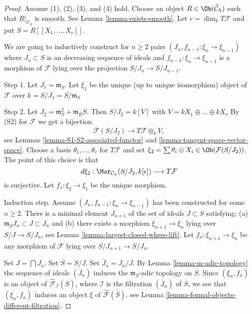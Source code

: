 \begin{proof}
Assume (1), (2), (3), and (4) hold. Choose an object
$R \in \Ob(\widehat{\mathcal{C}}_\Lambda)$
such that $\underline{R}|_{\mathcal{C}_\Lambda}$ is smooth.
See Lemma \ref{lemma-exists-smooth}.
Let $r = \dim_k T\mathcal{F}$ and put $S = R[[X_1, \ldots, X_r]]$.

\medskip\noindent
We are going to inductively construct for $n \geq 2$ pairs
$(J_n, f_{n - 1} : \xi_n \to \xi_{n - 1})$
where $J_n \subset S$ is an decreasing sequence of ideals and
$f_{n - 1} : \xi_n \to \xi_{n - 1}$ is a morphism of
$\mathcal{F}$ lying over the projection $S/J_n \to S/J_{n - 1}$.

\medskip\noindent
Step 1. Let $J_1 = \mathfrak m_S$. Let $\xi_1$ be the unique
(up to unique isomorphism) object of $\mathcal{F}$ over
$k = S/J_1 = S/\mathfrak m_S$

\medskip\noindent
Step 2. Let
$J_2 = \mathfrak m_S^2 + \mathfrak{m}_R S$. Then
$S/J_2 = k[V]$ with $V = kX_1 \oplus \ldots \oplus kX_r$
By (S2) for $\overline{\mathcal{F}}$ we get a bijection
$$
\overline{\mathcal{F}}(S/J_2)
\longrightarrow
T\mathcal{F} \otimes_k V,
$$
see
Lemmas \ref{lemma-S1-S2-associated-functor} and
\ref{lemma-tangent-space-vector-space}.
Choose a basis $\theta_1, \ldots, \theta_r$ for $T\mathcal{F}$ and set
$\xi_2 = \sum \theta_i \otimes X_i \in \Ob(\mathcal{F}(S/J_2))$.
The point of this choice is that
$$
d\xi_2 :
\Mor_{\mathcal{C}_\Lambda}(S/J_2, k[\epsilon])
\longrightarrow
T\mathcal{F}
$$
is surjective. Let $f_1 : \xi_2 \to \xi_1$ be the unique morphism.

\medskip\noindent
Induction step. Assume $(J_n, f_{n - 1} : \xi_n \to \xi_{n - 1})$ has been
constructed for some $n \geq 2$. There is a minimal element $J_{n + 1}$ of
the set of ideals $J \subset S$ satisfying:
(a) $\mathfrak m_S J_n \subset J \subset J_n$ and
(b) there exists a morphism $\xi_{n + 1} \to \xi_n$ lying over
$S/J \to S/J_n$, see
Lemma \ref{lemma-largest-closed-where-lift}.
Let $f_n : \xi_{n + 1} \to \xi_n$ be any morphism of $\mathcal{F}$
lying over $S/J_{n + 1} \to S/J_n$.

\medskip\noindent
Set $J = \bigcap J_n$. Set $\overline{S} = S/J$. Set $\overline{J}_n = J_n/J$.
By
Lemma \ref{lemma-m-adic-topology}
the sequence of ideals $(\overline{J}_n)$ induces the
$\mathfrak m_{\overline{S}}$-adic topology on $\overline{S}$.
Since $(\xi_n, f_n)$ is an object of
$\widehat{\mathcal{F}}_\mathcal{I}(\overline{S})$, where $\mathcal{I}$
is the filtration $(\overline{J}_n)$ of $\overline{S}$,
we see that $(\xi_n, f_n)$
induces an object $\xi$ of $\widehat{\mathcal{F}}(\overline{S})$.
see
Lemma \ref{lemma-formal-objects-different-filtration}.


\end{proof}
